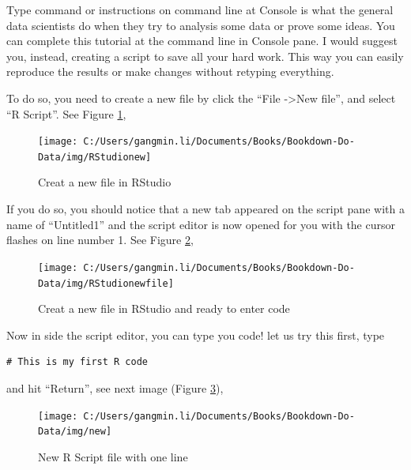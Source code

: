 \documentclass[
]{book}
\begin{document}
Type command or instructions on command line at Console is what the general data scientists do when they try to analysis some data or prove some ideas. You can complete this tutorial at the command line in Console pane. I would suggest you, instead, creating a script to save all your hard work. This way you can easily reproduce the results or make changes without retyping everything.

To do so, you need to create a new file by click the ``File -\textgreater New file'', and select ``R Script''. See Figure \ref{fig:newrfile},

\begin{figure}

{\centering \texttt{[image: C:/Users/gangmin.li/Documents/Books/Bookdown-Do-Data/img/RStudionew]} 

}

\caption{Creat a new file in RStudio}\label{fig:newrfile}
\end{figure}

If you do so, you should notice that a new tab appeared on the script pane with a name of ``Untitled1'' and the script editor is now opened for you with the cursor flashes on line number 1. See Figure \ref{fig:newrcfile},

\begin{figure}

{\centering \texttt{[image: C:/Users/gangmin.li/Documents/Books/Bookdown-Do-Data/img/RStudionewfile]} 

}

\caption{Creat a new file in RStudio and ready to enter code}\label{fig:newrcfile}
\end{figure}

Now in side the script editor, you can type you code! let us try this first, type

\begin{verbatim}
# This is my first R code
\end{verbatim}

and hit ``Return'', see next image (Figure \ref{fig:newrcode}),

\begin{figure}

{\centering \texttt{[image: C:/Users/gangmin.li/Documents/Books/Bookdown-Do-Data/img/new]} 

}

\caption{New R Script file with one line}\label{fig:newrcode}
\end{figure}
\end{document}
